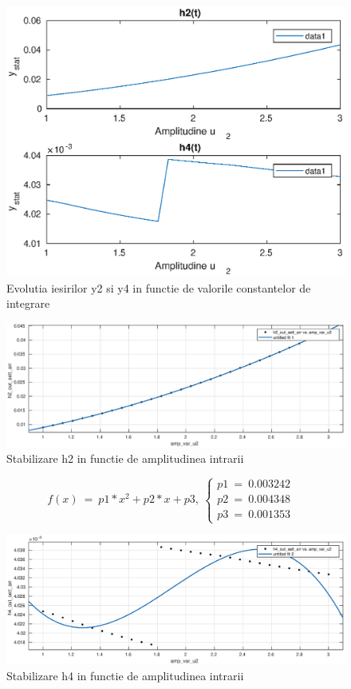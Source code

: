 \documentclass[12pt,english]{article}
\begin{document}
\begin{figure} [H]
	\includegraphics[width=1\textwidth]{c_1.eps}
	\caption{Evolutia iesirilor y2 si y4 in functie de valorile constantelor de integrare}
\end{figure}

\begin{figure} [H]
	\includegraphics[width=1\textwidth]{c_2_1.eps}
	\caption{Stabilizare h2 in functie de amplitudinea intrarii}
\end{figure}

\pagebreak
{}

\begin{equation*}
f( x) \ =\ p1*x^{2} +p2*x+p3,\ \begin{cases}
		p1\ =\ 0.003242 & \\
		p2\ =\ 0.004348 & \\
		p3\ =\ 0.001353 & 
	\end{cases}
\end{equation*}


\begin{figure} [H]
	\includegraphics[width=1\textwidth]{c_2_2.eps}
	\caption{Stabilizare h4 in functie de amplitudinea intrarii}
\end{figure}
\end{document}
